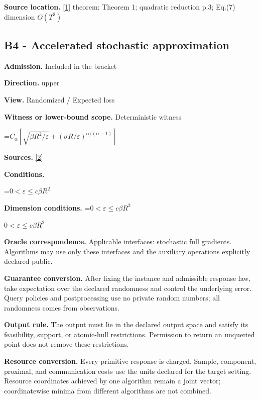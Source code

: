 \documentclass[10pt,a4paper]{article}
\newcommand{\AtlasMath}[1]{\par\begingroup\centering\setbox0=\hbox{$\displaystyle #1$}\ifdim\wd0>1.4\linewidth\typeout{ATLAS WIDE FORMULA: \the\wd0}\fi\ifdim\wd0>\linewidth\resizebox{\linewidth}{!}{\box0}\else\box0\fi\par\endgroup}
\newcommand{\AtlasInlineMath}[1]{\begingroup\setbox0=\hbox{$#1$}\ifdim\wd0>.4\linewidth\endgroup\AtlasMath{#1}\else\endgroup$#1$\fi}
\begin{document}
\textbf{Source location.} \href{https://arxiv.org/pdf/2609.10874}{[1]} theorem: Theorem 1; quadratic reduction p.3; Eq.(7) dimension $O(T^2)$



\subsection{B4 - Accelerated stochastic approximation}


\textbf{Admission.} Included in the bracket



\textbf{Direction.} upper



\textbf{View.} Randomized / Expected loss



\textbf{Witness or lower-bound scope.} Deterministic witness



\AtlasMath{C_\alpha[\sqrt{\beta R^2/\varepsilon}+(\sigma R/\varepsilon)^{\alpha/(\alpha-1)}]}


\textbf{Sources.} \href{https://arxiv.org/pdf/2510.11676}{[2]}



\textbf{Conditions.}
\AtlasMath{0<\varepsilon\le c\beta R^2}




\textbf{Dimension conditions.} \AtlasInlineMath{0<\varepsilon\le c\beta R^2}



\textbf{Oracle correspondence.} Applicable interfaces: stochastic full gradients. Algorithms may use only these interfaces and the auxiliary operations explicitly declared public.



\textbf{Guarantee conversion.} After fixing the instance and admissible response law, take expectation over the declared randomness and control the underlying error. Query policies and postprocessing use no private random numbers; all randomness comes from observations.



\textbf{Output rule.} The output must lie in the declared output space and satisfy its feasibility, support, or atomic-hull restrictions. Permission to return an unqueried point does not remove these restrictions.



\textbf{Resource conversion.} Every primitive response is charged. Sample, component, proximal, and communication costs use the units declared for the target setting. Resource coordinates achieved by one algorithm remain a joint vector; coordinatewise minima from different algorithms are not combined.
\end{document}
